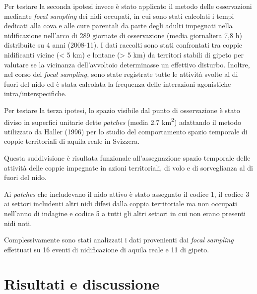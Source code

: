 Per testare la seconda ipotesi invece \`e stato applicato il metodo
delle osservazioni mediante \textit{focal sampling} dei nidi occupati,
in cui sono stati calcolati i tempi dedicati alla cova e alle cure
parentali da parte degli adulti impegnati nella nidificazione
nell{\textquoteright}arco di 289 giornate di osservazione (media
giornaliera 7,8 h) distribuite su 4 anni (2008-11). I dati raccolti
sono stati confrontati tra coppie nidificanti vicine ({\textless} 5 km)
e lontane ({\textgreater} 5 km) da territori stabili di gipeto per
valutare se la vicinanza dell{\textquoteright}avvoltoio determinasse un
effettivo disturbo. Inoltre, nel corso del \textit{focal sampling,}
sono state registrate tutte le attivit\`a svolte al di fuori del nido
ed \`e stata calcolata la frequenza delle interazioni agonistiche
intra/interspecifiche. 

Per testare la terza ipotesi, lo spazio visibile dal punto di
osservazione \`e stato diviso in superfici unitarie dette
\textit{patches} (media 2.7 km\textsuperscript{2}) adattando il metodo
utilizzato da Haller (1996) per lo studio del comportamento spazio
temporale di coppie territoriali di aquila reale in Svizzera. 

Questa suddivisione \`e risultata funzionale
all{\textquoteright}assegnazione spazio temporale delle attivit\`a
delle coppie impegnate in azioni territoriali, di volo e di
sorveglianza al di fuori del nido. 

Ai \textit{patches} che includevano il nido attivo \`e stato assegnato
il codice 1, il codice 3 ai settori includenti altri nidi difesi dalla
coppia territoriale ma non occupati nell{\textquoteright}anno di
indagine e codice 5 a tutti gli altri settori in cui non erano presenti
nidi noti.

Complessivamente sono stati analizzati i dati provenienti dai
\textit{focal sampling} effettuati su 16 eventi di nidificazione di
aquila reale e 11 di gipeto. 

\section*{Risultati e discussione}

